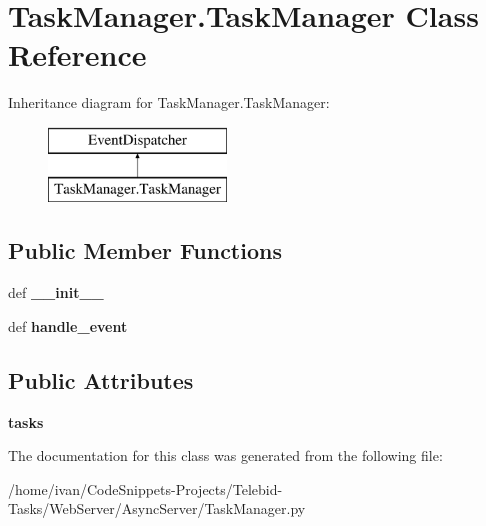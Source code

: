 \hypertarget{class_task_manager_1_1_task_manager}{\section{Task\-Manager.\-Task\-Manager Class Reference}
\label{class_task_manager_1_1_task_manager}
}
Inheritance diagram for Task\-Manager.\-Task\-Manager\-:\begin{figure}[H]
\begin{center}
\leavevmode
\includegraphics[height=2.000000cm]{class_task_manager_1_1_task_manager}
\end{center}
\end{figure}
\subsection*{Public Member Functions}
\begin{DoxyCompactItemize}
\item 
\hypertarget{class_task_manager_1_1_task_manager_aa82c3de5047eaa601901d9bba3c0b347}{def {\bfseries \-\_\-\-\_\-init\-\_\-\-\_\-}}\label{class_task_manager_1_1_task_manager_aa82c3de5047eaa601901d9bba3c0b347}

\item 
\hypertarget{class_task_manager_1_1_task_manager_a630d6f3fda9e0acc504e65236f923fa9}{def {\bfseries handle\-\_\-event}}\label{class_task_manager_1_1_task_manager_a630d6f3fda9e0acc504e65236f923fa9}

\end{DoxyCompactItemize}
\subsection*{Public Attributes}
\begin{DoxyCompactItemize}
\item 
\hypertarget{class_task_manager_1_1_task_manager_a87766832accfef894e63b6510d113817}{{\bfseries tasks}}\label{class_task_manager_1_1_task_manager_a87766832accfef894e63b6510d113817}

\end{DoxyCompactItemize}


The documentation for this class was generated from the following file\-:\begin{DoxyCompactItemize}
\item 
/home/ivan/\-Code\-Snippets-\/\-Projects/\-Telebid-\/\-Tasks/\-Web\-Server/\-Async\-Server/Task\-Manager.\-py\end{DoxyCompactItemize}
